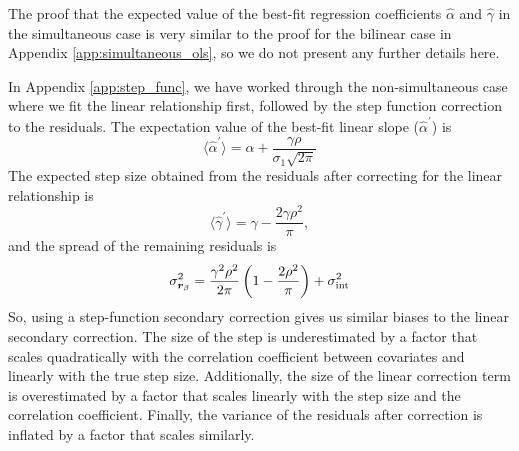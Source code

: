 The proof that the expected value of the best-fit regression coefficients $\hat{\alpha}$ and $\hat{\gamma}$ in the simultaneous case is very similar to the proof for the bilinear case in Appendix \ref{app:simultaneous_ols}, so we do not present any further details here.

In Appendix \ref{app:step_func}, we have worked through the non-simultaneous case where we fit the linear relationship first, followed by the step function correction to the residuals. The expectation value of the best-fit linear slope ($\hat{\alpha}^\prime$) is
\begin{equation}
    \langle\hat{\alpha}^\prime\rangle = \alpha + \frac{\gamma\rho}{\sigma_1\sqrt{2\pi}}
    \label{eqn:slope_inflation}
\end{equation}
The expected step size obtained from the residuals after correcting for the linear relationship is
\begin{equation}
    \langle\hat{\gamma}^\prime\rangle = \gamma - \frac{2\gamma\rho^2}{\pi},
    \label{eqn:step_deflation}
\end{equation}
and the spread of the remaining residuals is
\begin{equation}
    \sigma_{\bm{r}_\beta}^2 = \frac{\gamma^2\rho^2}{2\pi}\left(1-\frac{2\rho^2}{\pi}\right) + \sigma_{\text{int}}^2
\end{equation}
So, using a step-function secondary correction gives us similar biases to the linear secondary correction. The size of the step is underestimated by a factor that scales quadratically with the correlation coefficient between covariates and linearly with the true step size. Additionally, the size of the linear correction term is overestimated by a factor that scales linearly with the step size and the correlation coefficient. Finally, the variance of the residuals after correction is inflated by a factor that scales similarly.

